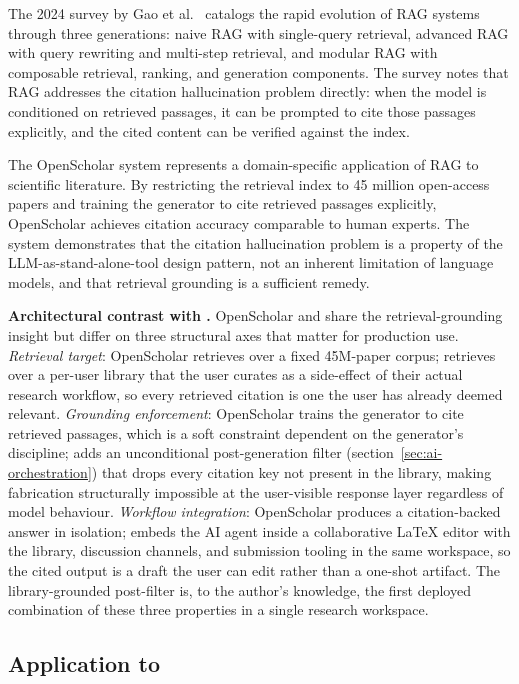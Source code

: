 The 2024 survey by Gao et al.\ \cite{gao2024ragsurvey} catalogs the rapid evolution of RAG systems through three generations: naive RAG with single-query retrieval, advanced RAG with query rewriting and multi-step retrieval, and modular RAG with composable retrieval, ranking, and generation components. The survey notes that RAG addresses the citation hallucination problem directly: when the model is conditioned on retrieved passages, it can be prompted to cite those passages explicitly, and the cited content can be verified against the index.

The OpenScholar system \cite{asai2025openscholar} represents a domain-specific application of RAG to scientific literature. By restricting the retrieval index to 45 million open-access papers and training the generator to cite retrieved passages explicitly, OpenScholar achieves citation accuracy comparable to human experts. The system demonstrates that the citation hallucination problem is a property of the LLM-as-stand-alone-tool design pattern, not an inherent limitation of language models, and that retrieval grounding is a sufficient remedy.

\textbf{Architectural contrast with \sh{}.} OpenScholar and \sh{} share the retrieval-grounding insight but differ on three structural axes that matter for production use. \emph{Retrieval target}: OpenScholar retrieves over a fixed 45M-paper corpus; \sh{} retrieves over a per-user library that the user curates as a side-effect of their actual research workflow, so every retrieved citation is one the user has already deemed relevant. \emph{Grounding enforcement}: OpenScholar trains the generator to cite retrieved passages, which is a soft constraint dependent on the generator's discipline; \sh{} adds an unconditional post-generation filter (section~\ref{sec:ai-orchestration}) that drops every citation key not present in the library, making fabrication structurally impossible at the user-visible response layer regardless of model behaviour. \emph{Workflow integration}: OpenScholar produces a citation-backed answer in isolation; \sh{} embeds the AI agent inside a collaborative LaTeX editor with the library, discussion channels, and submission tooling in the same workspace, so the cited output is a draft the user can edit rather than a one-shot artifact. The library-grounded post-filter is, to the author's knowledge, the first deployed combination of these three properties in a single research workspace.

\subsection{Application to \sh{}}


